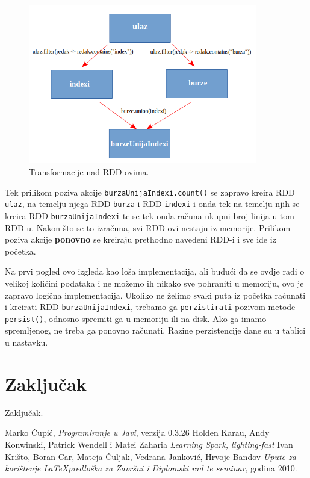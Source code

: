 \documentclass[times, utf8, zavrsni]{fer}
\begin{document}
\begin{figure}[htb]
\centering
\includegraphics[width=10cm]{img/burzeUnijaIndexiRDD.png}
\caption{Transformacije nad RDD-ovima.}
\label{fig:burzeUnijaIndexiRDD}
\end{figure}

Tek prilikom poziva akcije \texttt{burzaUnijaIndexi.count()} se zapravo kreira RDD \texttt{ulaz}, na temelju njega RDD \texttt{burza} i RDD \texttt{indexi} i onda tek na temelju njih se kreira RDD \texttt{burzaUnijaIndexi} te se tek onda računa ukupni broj linija u tom RDD-u. Nakon što se to izračuna, svi RDD-ovi nestaju iz memorije.  Prilikom poziva akcije  \textbf{ponovno} se kreiraju prethodno navedeni RDD-i i sve ide iz početka.

Na prvi pogled ovo izgleda kao loša implementacija, ali budući da se ovdje radi o velikoj količini podataka i ne možemo ih nikako sve pohraniti u memoriju, ovo je zapravo logična implementacija. Ukoliko ne želimo svaki puta iz početka računati i kreirati RDD \texttt{burzaUnijaIndexi}, trebamo ga \texttt{perzistirati} pozivom metode \texttt{persist()}, odnosno spremiti ga u memoriju ili na disk. Ako ga imamo spremljenog, ne treba ga ponovno računati. Razine perzistencije dane su u tablici u nastavku.  


\chapter{Zaključak} 
Zaključak.

\begin{thebibliography}{9}
  Marko Čupić,
  \emph{Programiranje u Javi},
  verzija 0.3.26
  Holden Karau, Andy Konwinski, Patrick Wendell i Matei Zaharia
  \emph{Learning Spark, lighting-fast}
  Ivan Krišto, Boran Car, Mateja Čuljak, Vedrana Janković, Hrvoje Bandov
  \emph{Upute za korištenje \LaTeX predloška za Završni i Diplomski rad te seminar},
  godina 2010.
\end{thebibliography}
\end{document}
